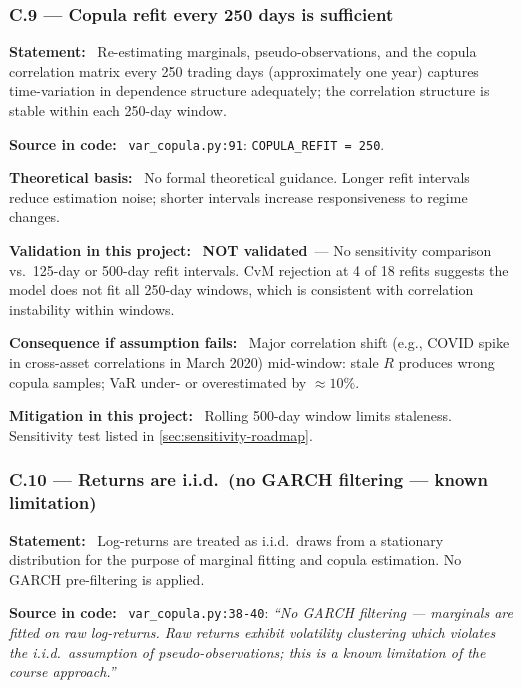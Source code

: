\documentclass[11pt,a4paper]{article}
\newcommand{\asmfield}[1]{\medskip\noindent\textbf{#1:}\ }
\newcommand{\code}[1]{\texttt{#1}}
\newcommand{\notvalidated}{\textbf{NOT validated}}
\begin{document}
\subsubsection{C.9 --- Copula refit every 250 days is sufficient}\label{asm:C9}

\asmfield{Statement}
Re-estimating marginals, pseudo-observations, and the copula correlation
matrix every 250 trading days (approximately one year) captures
time-variation in dependence structure adequately; the correlation structure
is stable within each 250-day window.

\asmfield{Source in code}
\code{var\_copula.py:91}: \lstinline|COPULA_REFIT = 250|.

\asmfield{Theoretical basis}
No formal theoretical guidance. Longer refit intervals reduce estimation
noise; shorter intervals increase responsiveness to regime changes.

\asmfield{Validation in this project}
\notvalidated\ --- No sensitivity comparison vs.\ 125-day or 500-day refit
intervals. CvM rejection at 4 of 18 refits suggests the model does not fit
all 250-day windows, which is consistent with correlation instability
within windows.

\asmfield{Consequence if assumption fails}
Major correlation shift (e.g., COVID spike in cross-asset correlations in
March 2020) mid-window: stale $R$ produces wrong copula samples; VaR
under- or overestimated by $\approx 10\%$.

\asmfield{Mitigation in this project}
Rolling 500-day window limits staleness. Sensitivity test listed in
\cref{sec:sensitivity-roadmap}.

\subsubsection{C.10 --- Returns are i.i.d.\ (no GARCH filtering --- known limitation)}\label{asm:C10}

\asmfield{Statement}
Log-returns are treated as i.i.d.\ draws from a stationary distribution
for the purpose of marginal fitting and copula estimation. No GARCH
pre-filtering is applied.

\asmfield{Source in code}
\code{var\_copula.py:38-40}: \emph{``No GARCH filtering --- marginals are
fitted on raw log-returns. Raw returns exhibit volatility clustering which
violates the i.i.d.\ assumption of pseudo-observations; this is a known
limitation of the course approach.''}
\end{document}
